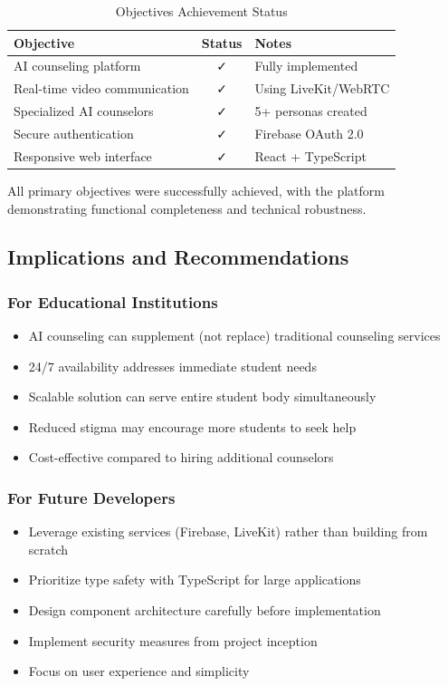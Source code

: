 \documentclass[11pt,a4paper]{article}
\begin{document}
\begin{table}[h]
\centering
\begin{tabular}{|l|c|l|}
\hline
\textbf{Objective} & \textbf{Status} & \textbf{Notes} \\
\hline
AI counseling platform & ✓ & Fully implemented \\
\hline
Real-time video communication & ✓ & Using LiveKit/WebRTC \\
\hline
Specialized AI counselors & ✓ & 5+ personas created \\
\hline
Secure authentication & ✓ & Firebase OAuth 2.0 \\
\hline
Responsive web interface & ✓ & React + TypeScript \\
\hline
\end{tabular}
\caption{Objectives Achievement Status}
\end{table}

All primary objectives were successfully achieved, with the platform demonstrating functional completeness and technical robustness.

\subsection{Implications and Recommendations}

\subsubsection{For Educational Institutions}
\begin{itemize}
    \item AI counseling can supplement (not replace) traditional counseling services
    \item 24/7 availability addresses immediate student needs
    \item Scalable solution can serve entire student body simultaneously
    \item Reduced stigma may encourage more students to seek help
    \item Cost-effective compared to hiring additional counselors
\end{itemize}

\subsubsection{For Future Developers}
\begin{itemize}
    \item Leverage existing services (Firebase, LiveKit) rather than building from scratch
    \item Prioritize type safety with TypeScript for large applications
    \item Design component architecture carefully before implementation
    \item Implement security measures from project inception
    \item Focus on user experience and simplicity
\end{itemize}
\end{document}
